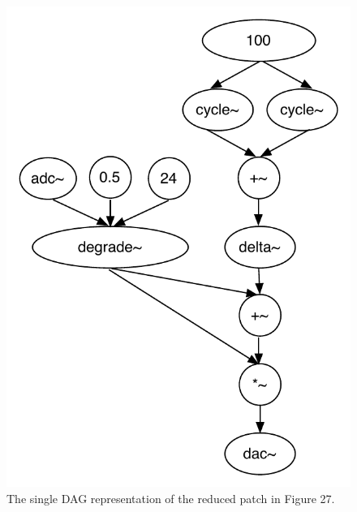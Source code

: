 \documentclass[12pt]{report} 	%
\numberwithin{figure}{chapter}
\numberwithin{table}{chapter}
\numberwithin{equation}{chapter}
\begin{document}
\begin{flushleft}
\begin{figure}[h!]
\begin{center}
\end{center}
\end{figure}
\begin{figure}[h!]
\begin{center}
\includegraphics[scale=0.8]{MaxDAGsSendReceive2}
\caption[Reducing a set of DAGs to a single DAG]{The single DAG representation of the reduced patch in Figure 27.}
\end{center}
\end{figure}


\end{flushleft}
\end{document}

